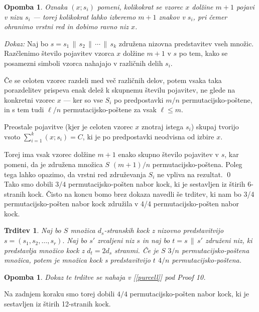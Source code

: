 \documentclass[a4paper, 12pt]{article}
\newtheorem{trditev}[definicija]{Trditev}
\newtheorem{opomba}[definicija]{Opomba}
\begin{document}
\begin{opomba}
Oznaka $(x; s_i)$ pomeni, kolikokrat se vzorec \( x \) dolžine \( m+1 \) pojavi v nizu \( s_i \) — torej kolikokrat lahko izberemo \( m+1 \) znakov v \( s_i \), pri čemer ohranimo vrstni red in dobimo ravno niz \( x \).
\end{opomba}


{\em Dokaz:\/}
Naj bo $s = s_1 \,\|\, s_2 \,\|\, \cdots \,\|\, s_k$ združena nizovna predstavitev vseh množic. Razčlenimo število pojavitev vzorca $x$ dolžine $m+1$ v $s$ po tem, kako se posamezni simboli vzorca nahajajo v različnih delih $s_i$.

Če se celoten vzorec razdeli med več različnih delov, potem vsaka taka porazdelitev prispeva enak delež k skupnemu številu pojavitev, ne glede na konkretni vzorec $x$ — ker so vse $S_i$ po predpostavki $m/n$ permutacijsko-poštene, in s tem tudi $\ell/n$ permutacijsko-poštene za vsak $\ell \le m$.

Preostale pojavitve (kjer je celoten vzorec $x$ znotraj istega $s_i$) skupaj tvorijo vsoto $\sum_{i=1}^{k} (x; s_i) = C$, ki je po predpostavki neodvisna od izbire $x$.

Torej ima vsak vzorec dolžine $m+1$ enako skupno število pojavitev v $s$, kar pomeni, da je združena množica $S$ $(m+1)/n$ permutacijsko-poštena. Poleg tega lahko opazimo, da vrstni red združevanja $S_i$ ne vpliva na rezultat.
\qed\\

Tako smo dobili $3/4$ permutacijsko-pošten nabor kock, ki je sestavljen iz štirih 6-stranih kock. Čisto na koncu bomo brez dokaza navedli še trditev, ki nam bo 3/4 permutacijsko-pošten nabor kock združila v 4/4 permutacijsko-pošten nabor kock.

\begin{trditev}
Naj bo $S$ množica $d_s$-stranskih kock z nizovno predstavitvijo $s = (s_1, s_2, \ldots, s_r).$
Naj bo $s'$ zrcaljeni niz $s$ in naj bo $t = s \,\|\, s'$
združeni niz, ki predstavlja množico kock z $d_t = 2 d_s$ stranmi. Če je $S$ $3/n$ permutacijsko-poštena množica, potem je množica kock s predstavitvijo $t$ $4/n$ permutacijsko-poštena.
\end{trditev}

\begin{opomba}
  Dokaz te trditve se nahaja v [\ref{purcell}] pod {\em Proof 10}.
\end{opomba}

Na zadnjem koraku smo torej dobili $4/4$ permutacijsko-pošten nabor kock, ki je sestavljen iz štirih 12-stranih kock.
\end{document}
